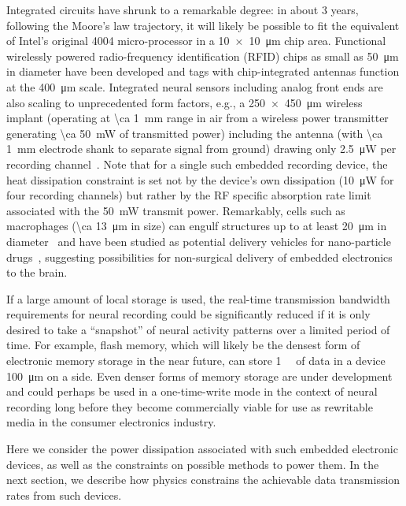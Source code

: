 Integrated circuits have shrunk to a remarkable degree: in about 3 years, following the Moore's law trajectory, it will likely be possible to fit the equivalent of Intel's original 4004 micro-processor in a \SI{10 x 10}{\micro\meter} chip area.
Functional wirelessly powered radio-frequency identification (RFID) chips as small as \SI{50}{\micro\meter} in diameter have been developed and tags with chip-integrated antennas function at the \SI{400}{\micro\meter} scale.
Integrated neural sensors including analog front ends are also scaling to unprecedented form factors, e.g., a \SI{250 x 450}{\micro\meter} wireless implant (operating at \SI{\ca 1}{\milli\meter} range in air from a wireless power transmitter generating \SI{\ca 50}{\milli\watt} of transmitted power) including the antenna (with \SI{\ca 1}{\milli\meter} electrode shank to separate signal from ground) drawing only \SI{2.5}{\micro\watt} per recording channel~\cite{biederman13}.
Note that for a single such embedded recording device, the heat dissipation constraint is set not by the device's own dissipation (\SI{10}{\micro\watt} for four recording channels) but rather by the RF specific absorption rate limit associated with the \SI{50}{\milli\watt} transmit power.
Remarkably, cells such as macrophages (\SI{\ca 13}{\micro\meter} in size) can engulf structures up to at least \SI{20}{\micro\meter} in diameter~\cite{cannon92} and have been studied as potential delivery vehicles for nano-particle drugs~\cite{Kadiu11}, suggesting possibilities for non-surgical delivery of embedded electronics to the brain.

If a large amount of local storage is used, the real-time transmission bandwidth requirements for neural recording could be significantly reduced if it is only desired to take a ``snapshot'' of neural activity patterns over a limited period of time.
For example, flash memory, which will likely be the densest form of electronic memory storage in the near future, can store \SI{1}{\mega\bit} of data in a device \SI{100}{\micro\meter} on a side.
Even denser forms of memory storage are under development and could perhaps be used in a one-time-write mode in the context of neural recording long before they become commercially viable for use as rewritable media in the consumer electronics industry.

Here we consider the power dissipation associated with such embedded electronic devices, as well as the constraints on possible methods to power them.
In the next section, we describe how physics constrains the achievable data transmission rates from such devices.

